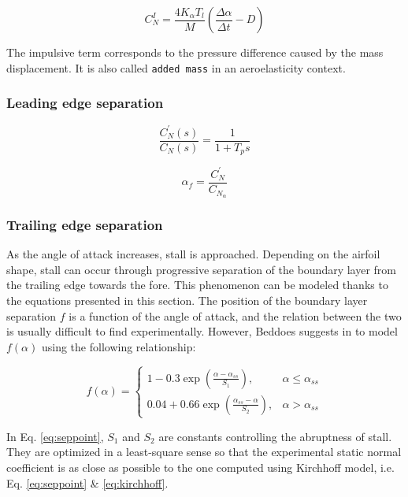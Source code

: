 \begin{equation}
C_{N}^{I}=\frac{4 K_{\alpha} T_{l}}{M}\left(\frac{\Delta \alpha}{\Delta t}-D\right)
\label{eq:impulsive}
\end{equation}

 The impulsive term corresponds to the pressure difference caused by the mass displacement. It is also called \texttt{added mass} in an aeroelasticity context.

\subsubsection{Leading edge separation}

\begin{equation}
\frac{C_N^{\prime}(s)}{C_N(s)} = \frac{1}{1+T_p s}
\label{•}  
\end{equation}

\begin{equation}
\alpha_f = \frac{C_N^{\prime}}{C_{N_\alpha}}
\label{eq:equivalent_alpha}
\end{equation}

\subsubsection{Trailing edge separation}
As the angle of attack increases, stall is approached. Depending on the airfoil shape, stall can occur through progressive separation of the boundary layer from the trailing edge towards the fore. This phenomenon can be modeled thanks to the equations presented in this section. 
The position of the boundary layer separation $f$ is a function of the angle of attack, and the relation between the two is usually difficult to find experimentally. However, Beddoes suggests in \autocite{beddoes_representation_1983} to model $f(\alpha)$ using the following relationship:

\begin{equation}
f(\alpha)=\left\{\begin{array}{ll}
1-0.3 \exp \left(\frac{\alpha-\alpha_{ss}}{S_{1}}\right), & \alpha \leq \alpha_{ss} \\
0.04+0.66 \exp \left(\frac{\alpha_{ss}-\alpha}{S_{2}}\right), & \alpha >\alpha_{ss}
\end{array}\right.
\label{eq:seppoint}
\end{equation}

In Eq. \eqref{eq:seppoint}, $S_1$ and $S_2$ are constants controlling the abruptness of stall. They are optimized in a least-square sense so that the experimental static normal coefficient is as close as possible to the one computed using Kirchhoff model, i.e. Eq. \eqref{eq:seppoint} \& \eqref{eq:kirchhoff}. 

